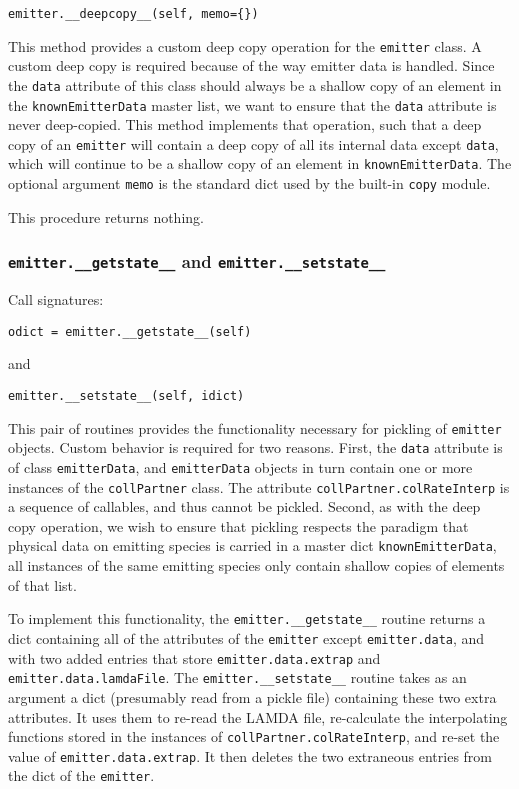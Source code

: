 \documentclass[12pt]{article}
\begin{document}
\begin{verbatim}
emitter.__deepcopy__(self, memo={})
\end{verbatim}

This method provides a custom deep copy operation for the \verb=emitter= class. A custom deep copy is required because of the way emitter data is handled. Since the \verb=data= attribute of this class should always be a shallow copy of an element in the \verb=knownEmitterData= master list, we want to ensure that the \verb=data= attribute is never deep-copied. This method implements that operation, such that a deep copy of an \verb=emitter= will contain a deep copy of all its internal data except \verb=data=, which will continue to be a shallow copy of an element in \verb=knownEmitterData=. The optional argument \verb=memo= is the standard dict used by the built-in \verb=copy= module.

This procedure returns nothing.

\subsubsection{\texttt{emitter.\_\_getstate\_\_} and \texttt{emitter.\_\_setstate\_\_}}

Call signatures:

\begin{verbatim}
odict = emitter.__getstate__(self)
\end{verbatim}
and
\begin{verbatim}
emitter.__setstate__(self, idict)
\end{verbatim}

This pair of routines provides the functionality necessary for pickling of \verb=emitter= objects. Custom behavior is required for two reasons. First, the \verb=data= attribute is of class \verb=emitterData=, and \verb=emitterData= objects in turn contain one or more instances of the \verb=collPartner= class. The attribute \verb=collPartner.colRateInterp= is a sequence of callables, and thus cannot be pickled. Second, as with the deep copy operation, we wish to ensure that pickling respects the paradigm that physical data on emitting species is carried in a master dict \verb=knownEmitterData=, all instances of the same emitting species only contain shallow copies of elements of that list.

To implement this functionality, the \verb=emitter.__getstate__= routine returns a dict containing all of the attributes of the \verb=emitter= except \verb=emitter.data=, and with two added entries that store \verb=emitter.data.extrap= and \verb=emitter.data.lamdaFile=. The \verb=emitter.__setstate__= routine takes as an argument a dict (presumably read from a pickle file) containing these two extra attributes. It uses them to re-read the LAMDA file, re-calculate the interpolating functions stored in the instances of \verb=collPartner.colRateInterp=, and re-set the value of \verb=emitter.data.extrap=. It then deletes the two extraneous entries from the dict of the \verb=emitter=.
\end{document}
